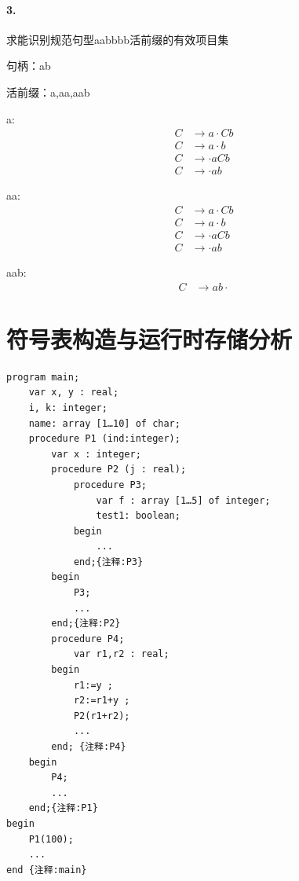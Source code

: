 \documentclass[UTF8]{ctexart} %
\begin{document}
\paragraph{3.} 求能识别规范句型aabbbb活前缀的有效项目集

句柄：ab

活前缀：a,aa,aab

a:
\begin{equation}
    \begin{aligned}
        C & \rightarrow a\cdot Cb \\
        C & \rightarrow a\cdot b  \\
        C & \rightarrow \cdot aCb \\
        C & \rightarrow \cdot ab
    \end{aligned}
\end{equation}

aa:
\begin{equation}
    \begin{aligned}
        C & \rightarrow a\cdot Cb \\
        C & \rightarrow a\cdot b  \\
        C & \rightarrow \cdot aCb \\
        C & \rightarrow \cdot ab
    \end{aligned}
\end{equation}

aab:
\begin{equation}
    \begin{aligned}
        C & \rightarrow ab\cdot
    \end{aligned}
\end{equation}

\newpage

\section{符号表构造与运行时存储分析}

\begin{lstlisting}
program main;
    var x, y : real;
    i, k: integer;
    name: array [1…10] of char;
    procedure P1 (ind:integer);
        var x : integer;
        procedure P2 (j : real);
            procedure P3;
                var f : array [1…5] of integer;
                test1: boolean;
            begin
                ...
            end;{注释:P3}
        begin
            P3;
            ...
        end;{注释:P2}
        procedure P4;
            var r1,r2 : real;
        begin
            r1:=y ;
            r2:=r1+y ;
            P2(r1+r2);
            ...
        end; {注释:P4}
    begin
        P4;
        ...
    end;{注释:P1}
begin
    P1(100);
    ...
end {注释:main}
\end{lstlisting}
\end{document}

